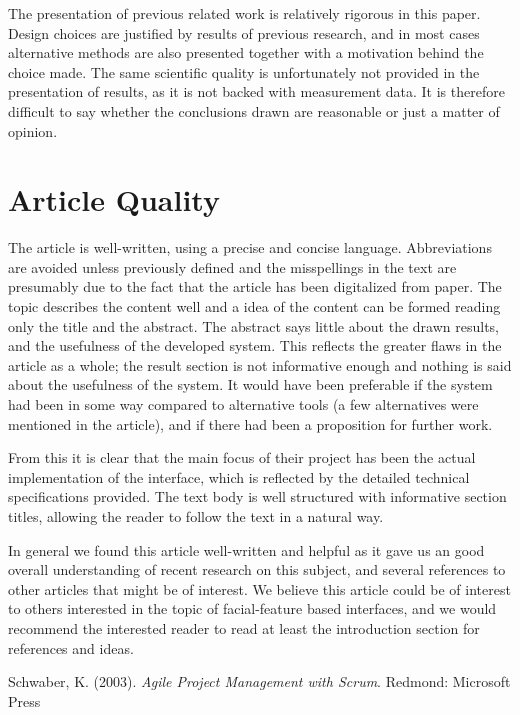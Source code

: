 \documentclass[a4paper,10pt]{article}
\begin{document}
The presentation of previous related work is relatively rigorous in this paper. Design choices are justified by results of previous research, and in most cases alternative methods are also presented together with a motivation behind the choice made. The same scientific quality is unfortunately not provided in the presentation of results, as it is not backed with measurement data. It is therefore difficult to say whether the conclusions drawn are reasonable or just a matter of opinion.

\section{Article Quality}
The article is well-written, using a precise and concise language. Abbreviations are avoided unless previously defined and the misspellings in the text are presumably due to the fact that the article has been digitalized from paper. The topic describes the content well and a idea of the content can be formed reading only the title and the abstract. The abstract says little about the drawn results, and the usefulness of the developed system. This reflects the greater flaws in the article as a whole; the result section is not informative enough and nothing is said about the usefulness of the system. It would have been preferable if the system had been in some way compared to alternative tools (a few alternatives were mentioned in the article), and if there had been a proposition for further work.

From this it is clear that the main focus of their project has been the actual implementation of the interface, which is reflected by the detailed technical specifications provided. The text body is well structured with informative section titles, allowing the reader to follow the text in a natural way.

In general we found this article well-written and helpful as it gave us an good overall understanding of recent research on this subject, and several references to other articles that might be of interest. We believe this article could be of interest to others interested in the topic of facial-feature based interfaces, and we would recommend the interested reader to read at least the introduction section for references and ideas.




\begin{thebibliography}{4}
 Schwaber, K. (2003). \emph{Agile Project Management with Scrum}. Redmond: Microsoft Press
\end{thebibliography}
\end{document}
